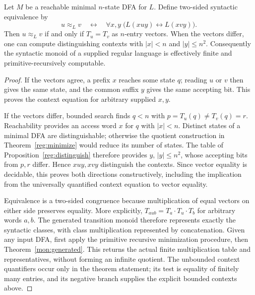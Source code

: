 \begin{theorem}
\label{mon:syntactic}
Let $M$ be a reachable minimal $n$-state DFA for $L$. Define two-sided
syntactic equivalence by
\[
 u\approx_L v\quad\longleftrightarrow\quad
 \forall x,y\;\bigl(L(xuy)\leftrightarrow L(xvy)\bigr).
\]
Then $u\approx_L v$ if and only if $T_u=T_v$ as $n$-entry vectors.
When the vectors differ, one can compute distinguishing contexts with
$|x|<n$ and $|y|\le n^2$. Consequently the syntactic monoid of a supplied
regular language is effectively finite and primitive-recursively computable.
\end{theorem}
\begin{proof}
If the vectors agree, a prefix $x$ reaches some state $q$; reading $u$ or
$v$ then gives the same state, and the common suffix $y$ gives the same
accepting bit. This proves the context equation for arbitrary supplied
$x,y$.

If the vectors differ, bounded search finds $q<n$ with
$p=T_u(q)\ne T_v(q)=r$. Reachability provides an access word $x$ for $q$
with $|x|<n$. Distinct states of a minimal DFA are distinguishable;
otherwise the quotient construction in Theorem~\ref{reg:minimize} would
reduce its number of states. The table of
Proposition~\ref{reg:distinguish} therefore provides $y$, $|y|\le n^2$,
whose accepting bits from $p,r$ differ. Hence $xuy,xvy$ distinguish the
contexts. Since vector equality is decidable, this proves both directions
constructively, including the implication from the universally quantified
context equation to vector equality.

Equivalence is a two-sided congruence because multiplication of equal
vectors on either side preserves equality. More explicitly,
$T_{aub}=T_a\cdot T_u\cdot T_b$ for arbitrary words $a,b$.
The generated transition monoid therefore represents exactly the syntactic
classes, with class multiplication represented by concatenation. Given any
input DFA, first apply the primitive recursive minimization procedure,
then Theorem~\ref{mon:generated}. This returns the actual finite multiplication
table and representatives, without forming an infinite quotient. The
unbounded context quantifiers occur only in the theorem statement;
its test is equality of finitely many entries, and its negative branch
supplies the explicit bounded contexts above.
\end{proof}


